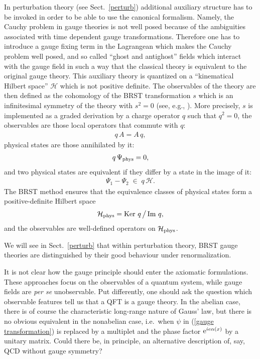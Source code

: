 \documentclass[multphys,vecphys]{svmult}
\newcommand{\bea}{\begin{eqnarray}}
\newcommand{\eea}{\end{eqnarray}}
\begin{document}
In perturbation theory (see
Sect.~\ref{perturb}) additional auxiliary structure has to be invoked
in order to be able to use the canonical formalism. Namely, the Cauchy
problem in gauge theories is not well posed because of the ambiguities
associated with time dependent gauge transformations. Therefore one
has to introduce a gauge fixing term in the Lagrangean which makes the
Cauchy problem well posed, and so called ``ghost
and antighost'' fields which interact with the gauge field in such a
way that the classical theory is equivalent to the original gauge
theory. This auxiliary theory is quantized on a
``kinematical Hilbert space'' ${\mathcal H}$ which is not
positive definite. The observables of the theory are then defined as
the cohomology of the BRST transformation $s$ which
is an infinitesimal symmetry of the theory with $s^2=0$ (see, e.g.,
\cite{Wein}). More precisely, $s$ is implemented as a graded
derivation by a charge operator $q$ such that $q^2=0$, the observables
are those local operators that commute with $q$: 
\bea 
  q \, A = A \, q, 
\eea
physical states are those annihilated by it:
\bea 
  q\,\Psi_{\rm phys} = 0,
\eea
and two physical states are equivalent if they differ by a state in
the image of it: 
\bea 
  \Psi_1 - \Psi_2 \;\in\; q\,{\mathcal H}.
\eea
The BRST method ensures that the equivalence
classes of physical states form a positive-definite
Hilbert space 
\bea {\mathcal H}_{\rm phys} = \hbox{Ker }q\,\big/\,\hbox{Im }q, \eea
and the observables are well-defined operators on ${\mathcal H}_{\rm phys}$.

We will see in Sect.~\ref{perturb} that within perturbation theory,
BRST gauge theories are distinguished by their good
behaviour under renormalization.
 

It is not clear how the gauge principle should enter 
the axiomatic formulations. These approaches
focus on the observables of a quantum system, while gauge fields are
{\em per se} unobservable. Put differently, one should ask the
question which observable features tell us that a QFT is a gauge
theory. In the abelian case, there is of course the characteristic
long-range nature of Gauss' law, but there is no obvious equivalent in
the nonabelian case, i.e.\ when $\psi$ in (\ref{gauge transformation})
is replaced by a multiplet and the phase factor
$\hbox{e}^{ie\alpha(x)}$ by a unitary matrix. Could there be, in
principle, an alternative description of, say, QCD without
gauge symmetry?  
\end{document}
